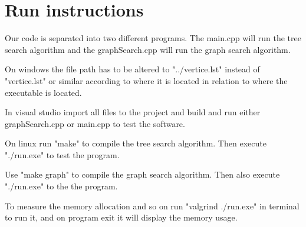 \documentclass[english]{gucreport}
\begin{document}
	\makefrontpages
	\tableofcontents
	\showindex		%
	
	
	
	
	
	
	
	\chapter{Run instructions}
		Our code is separated into two different programs. The main.cpp will run the
		tree search algorithm and the graphSearch.cpp will run the graph search
		algorithm.

		On windows the file path has to be altered to "../vertice.lst" instead of
		"vertice.lst" or similar according to where it is located in relation to
		where the executable is located.

		In visual studio import all files to the project and build and run either
		graphSearch.cpp or main.cpp to test the software.

		On linux run "make" to compile the tree search algorithm. Then execute 
		"./run.exe" to test the program.

		Use "make graph" to compile the graph search algorithm. Then also execute
		"./run.exe" to the the program.  
		
		To measure the memory allocation and so on run "valgrind ./run.exe" in
		terminal to run it, and on program exit it will display the memory usage.
\end{document}
